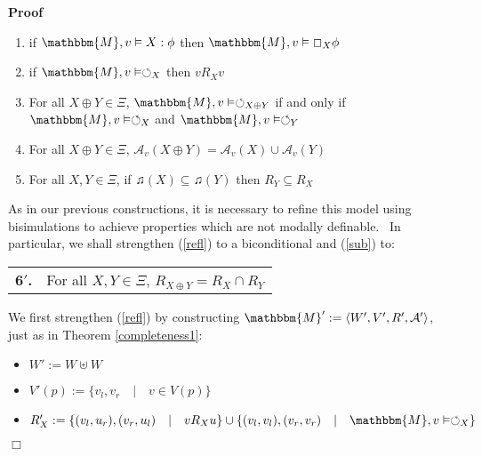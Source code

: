 \documentclass{acmconf}
\newcommand{\assign}{:=}
\newcommand{\tmtextbf}[1]{{\bfseries{#1}}}
\newenvironment{enumeratenumeric}{\begin{enumerate}[1.] }{\end{enumerate}}
\newenvironment{itemizedot}{\begin{itemize} \renewcommand{\labelitemi}{$\bullet$}\renewcommand{\labelitemii}{$\bullet$}\renewcommand{\labelitemiii}{$\bullet$}\renewcommand{\labelitemiv}{$\bullet$}}{\end{itemize}}
\newenvironment{proof}{\noindent\textbf{Proof\ }}{\hspace*{\fill}$\Box$\medskip}
\begin{document}
\begin{proof}
\begin{enumeratenumeric}
    \item if $\mathbbm{M}, v \vDash X : \phi$ then $\mathbbm{M}, v \vDash
    \Box_X \phi$
    
    \item \label{refl}if $\mathbbm{M}, v \vDash \circlearrowleft_X$ then $v
    R_X v$
    
    \item \label{sndness}For all $X \oplus Y \in \Xi$, $\mathbbm{M}, v \vDash
    \circlearrowleft_{X \oplus Y}$ if and only if $\mathbbm{M}, v \vDash
    \circlearrowleft_X$ and $\mathbbm{M}, v \vDash \circlearrowleft_Y$
    
    \item \label{union}For all $X \oplus Y \in \Xi$, $\mathcal{A}_v (X \oplus
    Y) = \mathcal{A}_v (X) \cup \mathcal{A}_v (Y)$
    
    \item \label{sub}For all $X, Y \in \Xi$, if $\twonotes (X) \subseteq
    \twonotes (Y)$ then $R_Y \subseteq R_X$
  \end{enumeratenumeric}
  As in our previous constructions, it is necessary to refine this model using
  bisimulations to achieve properties which are not modally definable. \ In
  particular, we shall strengthen (\ref{refl}) to a biconditional and
  (\ref{sub}) to:
  
  \begin{center}
    \begin{tabular}{ll}
      \tmtextbf{6$'$.} & For all $X, Y \in \Xi$, $R_{X \oplus Y} = R_X \cap
      R_Y$
    \end{tabular}
  \end{center}
  
  
  
  We first strengthen (\ref{refl}) by constructing $\mathbbm{M}' \assign
  \langle W', V', R', \mathcal{A}' \rangle$, just as in Theorem
  \ref{completeness1}: {\hspace*{\fill}}
  \begin{itemizedot}
    \item $W' \assign W \uplus W$
    
    \item $V' (p) \assign \{v_l, v_r \hspace{1em} | \hspace{1em} v \in V
    (p)\}$
    
    \item $R'_X \assign \{(v_l, u_r), (v_r, u_l) \hspace{1em} | \hspace{1em} v
    R_X u\} \cup \{(v_l, v_l), (v_r, v_r) \hspace{1em} | \hspace{1em}
    \mathbbm{M}, v \vDash \circlearrowleft_X \}$
    

\end{itemizedot}
\end{proof}
\end{document}
